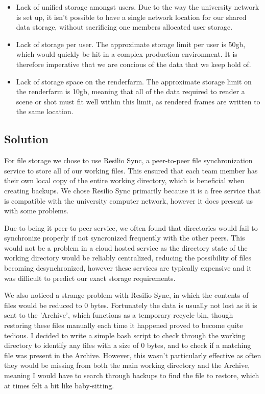 \documentclass[11pt]{article}
\begin{document}
\begin{itemize}

\item Lack of unified storage amongst users. Due to the way the university network is set up, it isn't possible to have a single network location for our shared data storage, without sacrificing one members allocated user storage.

\item Lack of storage per user. The approximate storage limit per user is 50gb, which would quickly be hit in a complex production environment. It is therefore imperative that we are concious of the data that we keep hold of.

\item Lack of storage space on the renderfarm. The approximate storage limit on the renderfarm is 10gb, meaning that all of the data required to render a scene or shot must fit well within this limit, as rendered frames are written to the same location.

\end{itemize}

\subsection{Solution}

For file storage we chose to use Resilio Sync, a peer-to-peer file synchronization service
to store all of our working files. This ensured that each team member has their own local copy of the entire working directory, which is beneficial when creating backups. We chose Resilio Sync primarily because it is a free service that is compatible with the university computer network, however it does present us with some problems.

Due to being it peer-to-peer service, we often found that directories would fail to synchronize properly if not syncronized frequently with the other peers. This would not be a problem in a cloud hosted service as the directory state of the working directory would be reliably centralized, reducing the possibility of files becoming desynchronized, however these services are typically expensive and it was difficult to predict our exact storage requirements.

We also noticed a strange problem with Resilio Sync, in which the contents of files would be reduced to 0 bytes. Fortunately the data is usually not lost as it is sent to the 'Archive', which functions as a temporary recycle bin, though restoring these files manually each time it happened proved to become quite tedious. I decided to write a simple bash script to check through the working directory to identify any files with a size of 0 bytes, and to check if a matching file was present in the Archive. However, this wasn't particularly effective as often they would be missing from both the main working directory and the Archive, meaning I would have to search through backups to find the file to restore, which at times felt a bit like baby-sitting.
\end{document}
